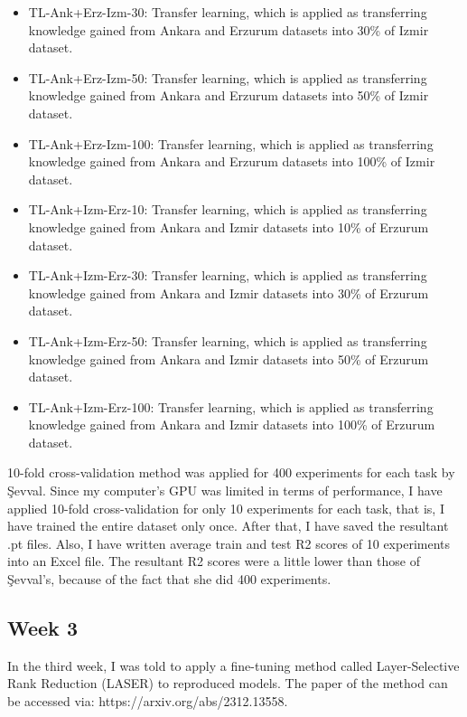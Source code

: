 \documentclass{article}
\begin{document}
\begin{itemize}
    \item TL-Ank+Erz-Izm-30: Transfer learning, which is applied as transferring knowledge gained from Ankara and Erzurum datasets into 30\% of Izmir dataset.
    \item TL-Ank+Erz-Izm-50: Transfer learning, which is applied as transferring knowledge gained from Ankara and Erzurum datasets into 50\% of Izmir dataset.
    \item TL-Ank+Erz-Izm-100: Transfer learning, which is applied as transferring knowledge gained from Ankara and Erzurum datasets into 100\% of Izmir dataset.
    \item TL-Ank+Izm-Erz-10: Transfer learning, which is applied as transferring knowledge gained from Ankara and Izmir datasets into 10\% of Erzurum dataset.
    \item TL-Ank+Izm-Erz-30: Transfer learning, which is applied as transferring knowledge gained from Ankara and Izmir datasets into 30\% of Erzurum dataset.
    \item TL-Ank+Izm-Erz-50: Transfer learning, which is applied as transferring knowledge gained from Ankara and Izmir datasets into 50\% of Erzurum dataset.
    \item TL-Ank+Izm-Erz-100: Transfer learning, which is applied as transferring knowledge gained from Ankara and Izmir datasets into 100\% of Erzurum dataset.
\end{itemize}

10-fold cross-validation method was applied for 400 experiments for each task by Şevval. Since my computer's GPU was limited in terms of performance, I have applied 10-fold cross-validation for only 10 experiments for each task, that is, I have trained the entire dataset only once. After that, I have saved the resultant .pt files. Also, I have written average train and test R2 scores of 10 experiments into an Excel file. The resultant R2 scores were a little lower than those of Şevval's, because of the fact that she did 400 experiments.

\subsection{Week 3}
\hspace{0.5cm}
In the third week, I was told to apply a fine-tuning method called Layer-Selective Rank Reduction (LASER) to reproduced models. The paper of the method can be accessed via: https://arxiv.org/abs/2312.13558.\\
\end{document}
